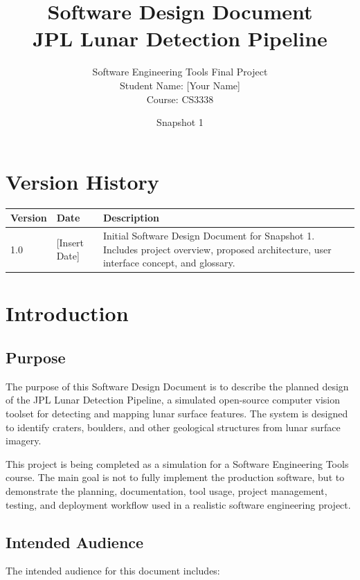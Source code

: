 \documentclass[12pt]{article}
\title{
    \textbf{Software Design Document} \\
    JPL Lunar Detection Pipeline
}
\author{
    Software Engineering Tools Final Project \\
    Student Name: [Your Name] \\
    Course: CS3338
}
\date{Snapshot 1}
\begin{document}
\maketitle
\newpage

\tableofcontents
\newpage

\section*{Version History}

\begin{longtable}{|p{1.5in}|p{1.5in}|p{3in}|}
\hline
\textbf{Version} & \textbf{Date} & \textbf{Description} \\
\hline
1.0 & [Insert Date] & Initial Software Design Document for Snapshot 1. Includes project overview, proposed architecture, user interface concept, and glossary. \\
\hline
\end{longtable}

\newpage

\section{Introduction}

\subsection{Purpose}

The purpose of this Software Design Document is to describe the planned design of the JPL Lunar Detection Pipeline, a simulated open-source computer vision toolset for detecting and mapping lunar surface features. The system is designed to identify craters, boulders, and other geological structures from lunar surface imagery. 

This project is being completed as a simulation for a Software Engineering Tools course. The main goal is not to fully implement the production software, but to demonstrate the planning, documentation, tool usage, project management, testing, and deployment workflow used in a realistic software engineering project.

\subsection{Intended Audience}

The intended audience for this document includes:
\end{document}
